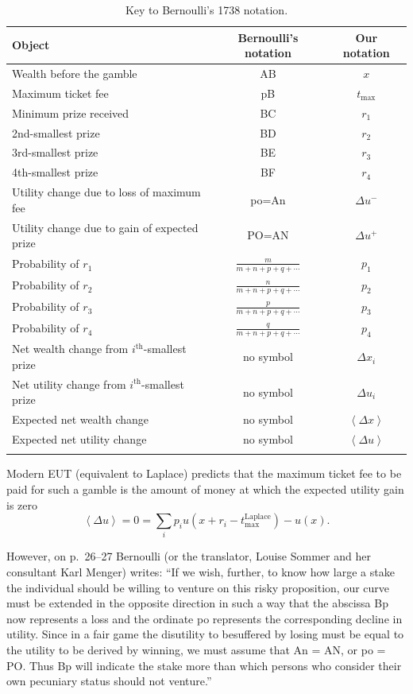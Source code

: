 \documentclass[dvips,draft]{ectaart}
\newcommand{\ave}[1]{\left\langle#1 \right\rangle}
\newcommand{\tlabel}[1]{\label{tab:#1}}
\newcommand{\be}{\begin{equation}}
\newcommand{\ee}{\end{equation}}
\newcommand{\Dx}{{\Delta x}}
\newcommand{\Du}{\Delta u}
\newcommand{\tml}{{t_{\text{max}}^{\text{Laplace}}}}
\begin{document}
\begin{center}
\begin{table}
  \begin{tabular}{ l | c | c }
    \hline
    Object & Bernoulli's notation & Our notation \\ \hline
    Wealth before the gamble & AB & $x$ \\
    Maximum ticket fee & pB & $t_{\text{max}}$ \\
    Minimum prize received & BC & $r_1$\\
    2nd-smallest prize & BD & $r_2$\\
    3rd-smallest prize & BE & $r_3$\\
    4th-smallest prize & BF & $r_4$\\
    Utility change due to loss of maximum fee & po=An &$\Du^{-}$\\
    Utility change due to gain of expected prize & PO=AN&$\Du^+$\\
Probability of $r_1$ &$\frac{m}{m+n+p+q+\cdots}$&$p_1$\\
Probability of $r_2$ &$\frac{n}{m+n+p+q+\cdots}$&$p_2$\\
Probability of $r_3$ &$\frac{p}{m+n+p+q+\cdots}$&$p_3$\\
Probability of $r_4$ &$\frac{q}{m+n+p+q+\cdots}$&$p_4$\\
Net wealth change from $i^{\text{th}}$-smallest prize & no symbol & $\Dx_i$\\
Net utility change from $i^{\text{th}}$-smallest prize & no symbol & $\Du_i$\\
Expected net wealth change & no symbol & $\ave{\Dx}$\\
Expected net utility change & no symbol & $\ave{\Du}$\\
    \hline
    \tlabel{key}
  \end{tabular}
\caption{Key to Bernoulli's 1738 notation.}
\end{table}
\end{center}

Modern EUT (equivalent to Laplace) predicts that the maximum ticket fee to be paid for such a gamble is the amount of money at which the expected utility gain is zero
\be
\ave{\Du}=0=\sum_i p_i u(x+r_i-\tml) - u(x).
\ee

However, on p.~26--27 Bernoulli (or the translator, Louise Sommer and her consultant Karl Menger) writes:
``If we wish, further, to know how large a stake the individual should be willing to venture on this risky proposition, our curve must be extended in the opposite direction in such a way that the abscissa Bp now represents a loss and the ordinate po represents the corresponding decline in utility. Since in a fair game the disutility to besuffered by losing must be equal to the utility to be derived by winning, we must assume that An = AN, or po = PO. Thus Bp will indicate the stake more than which persons who consider their own pecuniary status should not venture.''
\end{document}
